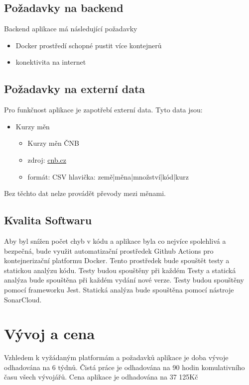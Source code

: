\documentclass[FM,SP]{tulthesis}
\begin{document}
\subsection{Požadavky na backend}
Backend aplikace má následující požadavky
\begin{itemize}
    \item Docker prostředí schopné pustit více kontejnerů
    \item konektivita na internet
\end{itemize}

\subsection{Požadavky na externí data}
Pro funkčnost aplikace je zapotřebí externí data.
Tyto data jsou:

\begin{itemize}
    \item Kurzy měn
          \begin{itemize}
              \item Kurzy měn ČNB
              \item zdroj: \href{https://www.cnb.cz/cs/financni_trhy/devizovy_trh/kurzy_devizoveho_trhu/denni_kurz.txt}{cnb.cz}
              \item formát: CSV
                    hlavička: země|měna|množství|kód|kurz
          \end{itemize}
\end{itemize}

Bez těchto dat nelze provádět převody mezi měnami.

\subsection{Kvalita Softwaru}
Aby byl snížen počet chyb v kódu a aplikace byla co nejvíce spolehlivá a bezpečná, bude využit automatizační prostředek Github Actions pro kontejnerizační platformu Docker. Tento prostředek bude spouštět testy a statickou analýzu kódu. Testy budou spouštěny při každém Testy a statická analýza bude spouštěna při každém vydání nové verze. Testy budou spouštěny pomocí frameworku Jest. Statická analýza bude spouštěna pomocí nástroje SonarCloud.

\section{Vývoj a cena}
Vzhledem k vyžádaným platformám a požadavků aplikace je doba vývoje odhadována na 6 týdnů. Čistá práce je odhadována na 90 hodin komulativního času všech vývojářů. Cena aplikace je odhadována na 37 125Kč
\end{document}
